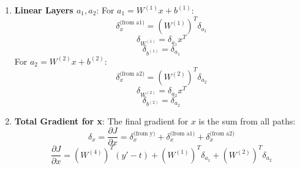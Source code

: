 \documentclass{article}
\begin{document}
\begin{enumerate}
    \item \textbf{Linear Layers $a_1, a_2$}:
    For $a_1 = W^{(1)}x + b^{(1)}$:
    \[ \delta_x^{\text{(from a1)}} = (W^{(1)})^T \delta_{a_1} \]
    \[ \delta_{W^{(1)}} = \delta_{a_1} x^T \]
    \[ \delta_{b^{(1)}} = \delta_{a_1} \]
    For $a_2 = W^{(2)}x + b^{(2)}$:
    \[ \delta_x^{\text{(from a2)}} = (W^{(2)})^T \delta_{a_2} \]
    \[ \delta_{W^{(2)}} = \delta_{a_2} x^T \]
    \[ \delta_{b^{(2)}} = \delta_{a_2} \]

    \item \textbf{Total Gradient for x}: The final gradient for $x$ is the sum from all paths:
    \[ \delta_x = \frac{\partial J}{\partial x} = \delta_x^{\text{(from y)}} + \delta_x^{\text{(from a1)}} + \delta_x^{\text{(from a2)}} \]
    \[ \frac{\partial J}{\partial x} = (W^{(4)})^T (y' - t) + (W^{(1)})^T \delta_{a_1} + (W^{(2)})^T \delta_{a_2} \]
\end{enumerate}
\end{document}

